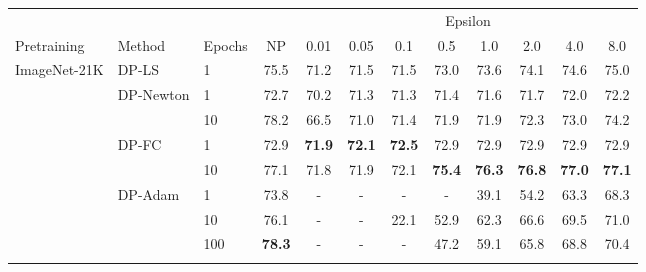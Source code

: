 \documentclass[letterpaper]{article} \usepackage{fullpage}
\begin{document}
\begin{table*}[!h]
	\centering
	\small
	\begin{tabular}{lllc|cccccccc}
		\toprule
		\addlinespace[0.1cm]
		& & & & \multicolumn{8}{c}{Epsilon} \\
		\addlinespace[0.1cm]
		\hline
		\addlinespace[0.1cm]
		Pretraining & Method                      & Epochs & NP            & 0.01 & 0.05 & 0.1  & 0.5  & 1.0  & 2.0  & 4.0  & 8.0  \\
		\midrule
		      
		\multirow{8}{*}{ImageNet-21K} 
		&  \multirow{ 1}{*}{DP-LS}
		                                          & 1 &      75.5          & 71.2 & 71.5 & 71.5 & 73.0 & 73.6 & 74.1 & 74.6 & 75.0 \\
		\addlinespace[0.1cm]
\addlinespace[0.1cm]
		            & \multirow{ 2}{*}{DP-Newton} & 1      & 72.7          & 70.2 & 71.3 & 71.3 & 71.4 & 71.6 & 71.7 & 72.0 & 72.2 \\
		            &                             & 10     & 78.2          & 66.5 & 71.0 & 71.4 & 71.9 & 71.9 & 72.3 & 73.0 & 74.2 \\
		\addlinespace[0.1cm]
\addlinespace[0.1cm]
		            & \multirow{ 2}{*}{DP-FC}     & 1      & 72.9          & \textbf{71.9} & \textbf{72.1} & \textbf{72.5} & 72.9 & 72.9 & 72.9 & 72.9 & 72.9 \\
		            &                             & 10     & 77.1          & 71.8 & 71.9 & 72.1 & \textbf{75.4} & \textbf{76.3} & \textbf{76.8} & \textbf{77.0} & \textbf{77.1} \\
		\addlinespace[0.1cm]
\addlinespace[0.1cm]
		            & \multirow{ 3}{*}{DP-Adam}   & 1      & 73.8          & -   & -   & -   & -   & 39.1 & 54.2 & 63.3 & 68.3 \\
		            &                             & 10     & 76.1          & -   & -   & 22.1 & 52.9 & 62.3 & 66.6 & 69.5 & 71.0 \\
		            &                             & 100    & \textbf{78.3} & -   & -   & -   & 47.2 & 59.1 & 65.8 & 68.8 & 70.4 \\


		\addlinespace[0.2cm]
		\hline
		\addlinespace[0.2cm]
		    

\end{tabular}
\end{table*}
\end{document}

